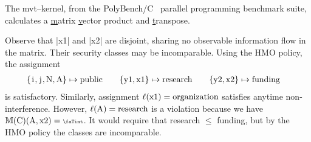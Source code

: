 \begin{example}
The mvt--kernel, from the {PolyBench/C}~\cite{polybench} parallel programming
benchmark suite, calculates a \underline{m}atrix \underline{v}ector product and
\underline{t}ranspose.

\begin{center}
\begin{minipage}{.55\textwidth}
\end{minipage}\hfill%
\begin{minipage}[b]{.40\textwidth}
\hfill\scalebox{.85}{$\begin{pNiceMatrix}[first-row,first-col]
& \prc|i|  & \prc|j| & \prc|N| & \prc|x1| & \prc|x2| & \prc|y1| & \prc|y2| & \prc|A| \\
\prc|i|   & \nv & \vi & \nv & \vi & \vi & \nv & \nv & \nv  \\
\prc|j|   & \nv & \nv & \nv & \vi & \vi & \nv & \nv & \nv  \\
\prc|N|   & \vi & \vi & \nv & \vi & \vi & \nv & \nv & \nv  \\
\prc|x1|  & \nv & \nv & \nv & \nv & \nv & \nv & \nv & \nv  \\
\prc|x2|  & \nv & \nv & \nv & \nv & \nv & \nv & \nv & \nv  \\
\prc|y1|  & \nv & \nv & \nv & \vi & \nv & \nv & \nv & \nv  \\
\prc|y2|  & \nv & \nv & \nv & \nv & \vi & \nv & \nv & \nv  \\
\prc|A|   & \nv & \nv & \nv & \vi & \vi & \nv & \nv & \nv  \\
\end{pNiceMatrix}$}
\end{minipage}
\end{center}

Observe that \prc|x1| and \prc|x2| are disjoint, sharing no observable
information flow in the matrix. Their security classes may be incomparable.
Using the HMO policy, the assignment
\begin{align*}
\{\prc|i|, \prc|j|, \prc|N|, \prc|A|\} &\mapsto \text{public} &&&
\{\prc|y1|, \prc|x1|\} & \mapsto \text{research} &&&
\{\prc|y2|, \prc|x2|\} & \mapsto \text{funding}
\end{align*}
is satisfactory.
Similarly, assignment \(\lvl{\prc|x1|} = \text{organization}\) satisfies anytime
non-interference. However, \(\lvl{\prc|A|} = \text{research}\) is a violation
because we have $\sfm{\prc|C|}(\prc|A|,\prc|x2|)=\vi$. It would require that
research $\leqslant$ funding, but by the HMO policy the classes are
incomparable.
 \end{example}


